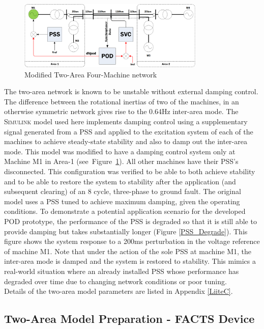 \documentclass[journal]{IEEEtran}
\begin{document}
\begin{figure}[!th]
\centering
\includegraphics[width=3.5in]{Kundur2Area_outline_multi.png}
\caption{Modified Two-Area Four-Machine network}
\label{NetworkOutline}
\end{figure}

The two-area network \cite{KundurTwoArea} is known to be unstable without external damping control. The difference between the rotational inertias of two of the machines, in an otherwise symmetric network gives rise to the 0.64Hz inter-area mode. The \textsc{Simulink} model used here implements damping control using a supplementary signal generated from a PSS and applied to the excitation system of each of the machines to achieve steady-state stability and also to damp out the inter-area mode. This model was modified to have a damping control system only at Machine M1 in Area-1 (see~Figure~\ref{NetworkOutline}). All other machines have their PSS's disconnected. This configuration was  verified to be able to both achieve stability and to be able to restore the system to stability after the application (and subsequent clearing) of an 8 cycle, three-phase to ground fault. The original model uses a PSS tuned to achieve maximum damping, given the operating conditions. To demonstrate a potential application scenario for the developed POD prototype, the performance of the PSS is degraded so that it is still able to provide damping but takes substantially longer (Figure \ref{PSS_Degrade}). This figure shows the system response to a 200ms perturbation in the voltage reference of machine M1. Note that under the action of the sole PSS at machine M1, the inter-area mode is damped and the system is restored to stability. This mimics a real-world situation where an already installed PSS whose performance has degraded over time due to changing network conditions or poor tuning.\\

Details of the two-area model parameters are listed in Appendix \ref{LiiteC}.\\


\subsection{Two-Area Model Preparation - FACTS Device}
\end{document}
